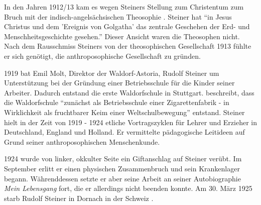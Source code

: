 In den Jahren 1912/13 kam es wegen Steiners Stellung zum Christentum zum Bruch mit der indisch-angelsächsischen Theosophie \citep[vgl.][S. 80]{hemleben63}. Steiner hat \enquote{in Jesus Christus und dem 'Ereignis von Golgatha' das zentrale Geschehen der Erd- und Menschheitsgeschichte gesehen.}  Dieser Ansicht waren die Theosophen nicht. Nach dem Rausschmiss Steiners von der theosophischen Gesellschaft 1913 fühlte er sich genötigt, die anthroposophische Gesellschaft zu gründen.

1919 bat Emil Molt, Direktor der Waldorf-Astoria, Rudolf Steiner um Unterstützung bei der Gründung einer Betriebsschule für die Kinder seiner Arbeiter. Dadurch entstand die erste Waldorfschule in Stuttgart. \citet[S. 124]{hemleben63} beschreibt, dass die Waldorfschule \enquote{zunächst als Betriebsschule einer Zigarettenfabrik - in Wirklichkeit als fruchtbarer Keim einer Weltschulbewegung} entstand. Steiner hielt in der Zeit von 1919 - 1924 etliche Vortragszyklen für Lehrer und Erzieher in Deutschland, England und Holland. Er vermittelte pädagogische Leitideen auf Grund seiner anthroposophischen Menschenkunde. 

1924 wurde von linker, okkulter Seite ein Giftanschlag auf Steiner verübt. Im September erlitt er einen physischen Zusammenbruch und sein Krankenlager begann. Währenddessen setzte er aber seine Arbeit an seiner Autobiographie \emph{Mein Lebensgang} fort, die er allerdings nicht beenden konnte. Am 30. März 1925 starb Rudolf Steiner in Dornach in der Schweiz \citep[vgl.][]{karl12}.


















